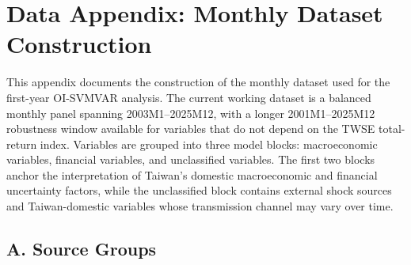 
\section*{Data Appendix: Monthly Dataset Construction}

\noindent This appendix documents the construction of the monthly dataset used for the first-year OI-SVMVAR analysis. The current working dataset is a balanced monthly panel spanning 2003M1--2025M12, with a longer 2001M1--2025M12 robustness window available for variables that do not depend on the TWSE total-return index. Variables are grouped into three model blocks: macroeconomic variables, financial variables, and unclassified variables. The first two blocks anchor the interpretation of Taiwan's domestic macroeconomic and financial uncertainty factors, while the unclassified block contains external shock sources and Taiwan-domestic variables whose transmission channel may vary over time.

\subsection*{A. Source Groups}

